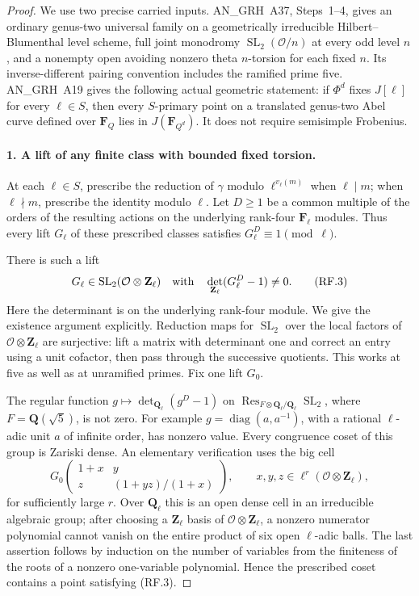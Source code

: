 \begin{proof}
We use two precise carried inputs.  AN\_GRH~A37, Steps~1--4,
gives an ordinary genus-two universal family on a geometrically
irreducible Hilbert--Blumenthal level scheme, full joint monodromy
$\operatorname{SL}_2(\mathcal O/n)$ at every odd level $n$, and
a nonempty open avoiding nonzero theta $n$-torsion for each fixed
$n$.  Its inverse-different pairing convention includes the
ramified prime five.  AN\_GRH~A19 gives the following actual
geometric statement: if $\Phi^d$ fixes $J[\ell]$ for every
$\ell\in S$, then every $S$-primary point on a translated genus-two
Abel curve defined over $\mathbf F_Q$ lies in
$J(\mathbf F_{Q^d})$.  It does not require semisimple Frobenius.

\paragraph{1. A lift of any finite class with bounded fixed torsion.}
At each $\ell\in S$, prescribe the reduction of $\gamma$ modulo
$\ell^{v_\ell(m)}$ when $\ell\mid m$; when $\ell\nmid m$,
prescribe the identity modulo $\ell$.  Let $D\geq1$ be a common
multiple of the orders of the resulting actions on the underlying
rank-four $\mathbf F_\ell$ modules.  Thus every lift $G_\ell$
of these prescribed classes satisfies $G_\ell^D\equiv1\pmod\ell$.

There is such a lift
\[
 G_\ell\in\operatorname{SL}_2(\mathcal O\otimes\mathbf Z_\ell)
 \quad\hbox{with}\quad
             \det_{\mathbf Z_\ell}(G_\ell^D-1)\ne0.          \tag{RF.3}
\]
Here the determinant is on the underlying rank-four module.
We give the existence argument explicitly.  Reduction maps for
$\operatorname{SL}_2$ over the local factors of
$\mathcal O\otimes\mathbf Z_\ell$ are surjective: lift a matrix
with determinant one and correct an entry using a unit cofactor,
then pass through the successive quotients.  This works at five
as well as at unramified primes.  Fix one lift $G_0$.

The regular function
$g\mapsto\det_{\mathbf Q_\ell}(g^D-1)$ on
$\operatorname{Res}_{F\otimes\mathbf Q_\ell/\mathbf Q_\ell}
\operatorname{SL}_2$, where $F=\mathbf Q(\sqrt5)$, is not zero.
For example $g=\operatorname{diag}(a,a^{-1})$, with a rational
$\ell$-adic unit $a$ of infinite order, has nonzero value.
Every congruence coset of this group is Zariski dense.  An
elementary verification uses the big cell
\[
 G_0\begin{pmatrix}
       1+x&y\\ z&(1+yz)/(1+x)
     \end{pmatrix},\qquad
 x,y,z\in\ell^r(\mathcal O\otimes\mathbf Z_\ell),             \tag{RF.4}
\]
for sufficiently large $r$.  Over $\mathbf Q_\ell$ this is an
open dense cell in an irreducible algebraic group; after choosing
a $\mathbf Z_\ell$ basis of $\mathcal O\otimes\mathbf Z_\ell$,
a nonzero numerator polynomial cannot vanish on the entire
product of six open $\ell$-adic balls.  The last assertion follows
by induction on the number of variables from the finiteness of
the roots of a nonzero one-variable polynomial.  Hence the
prescribed coset contains a point satisfying (RF.3).


\end{proof}
